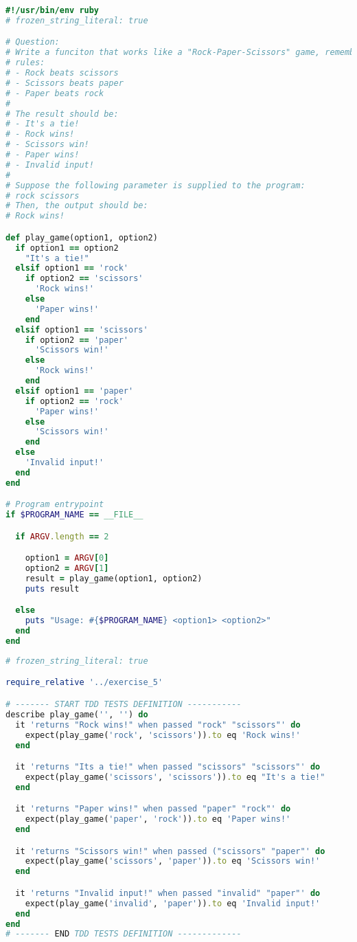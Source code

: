 \begin{lstlisting}[language=ruby,caption={exercise\_5.rb},captionpos=b]
#!/usr/bin/env ruby
# frozen_string_literal: true

# Question:
# Write a funciton that works like a "Rock-Paper-Scissors" game, remember the
# rules:
# - Rock beats scissors
# - Scissors beats paper
# - Paper beats rock
#
# The result should be:
# - It's a tie!
# - Rock wins!
# - Scissors win!
# - Paper wins!
# - Invalid input!
#
# Suppose the following parameter is supplied to the program:
# rock scissors
# Then, the output should be:
# Rock wins!

def play_game(option1, option2)
  if option1 == option2
    "It's a tie!"
  elsif option1 == 'rock'
    if option2 == 'scissors'
      'Rock wins!'
    else
      'Paper wins!'
    end
  elsif option1 == 'scissors'
    if option2 == 'paper'
      'Scissors win!'
    else
      'Rock wins!'
    end
  elsif option1 == 'paper'
    if option2 == 'rock'
      'Paper wins!'
    else
      'Scissors win!'
    end
  else
    'Invalid input!'
  end
end

# Program entrypoint
if $PROGRAM_NAME == __FILE__

  if ARGV.length == 2

    option1 = ARGV[0]
    option2 = ARGV[1]
    result = play_game(option1, option2)
    puts result

  else
    puts "Usage: #{$PROGRAM_NAME} <option1> <option2>"
  end
end
\end{lstlisting}

\begin{lstlisting}[language=ruby,caption={exercise\_5\_spec.rb},captionpos=b]
# frozen_string_literal: true

require_relative '../exercise_5'

# ------- START TDD TESTS DEFINITION -----------
describe play_game('', '') do
  it 'returns "Rock wins!" when passed "rock" "scissors"' do
    expect(play_game('rock', 'scissors')).to eq 'Rock wins!'
  end

  it 'returns "Its a tie!" when passed "scissors" "scissors"' do
    expect(play_game('scissors', 'scissors')).to eq "It's a tie!"
  end

  it 'returns "Paper wins!" when passed "paper" "rock"' do
    expect(play_game('paper', 'rock')).to eq 'Paper wins!'
  end

  it 'returns "Scissors win!" when passed ("scissors" "paper"' do
    expect(play_game('scissors', 'paper')).to eq 'Scissors win!'
  end

  it 'returns "Invalid input!" when passed "invalid" "paper"' do
    expect(play_game('invalid', 'paper')).to eq 'Invalid input!'
  end
end
# ------- END TDD TESTS DEFINITION -------------
\end{lstlisting}

